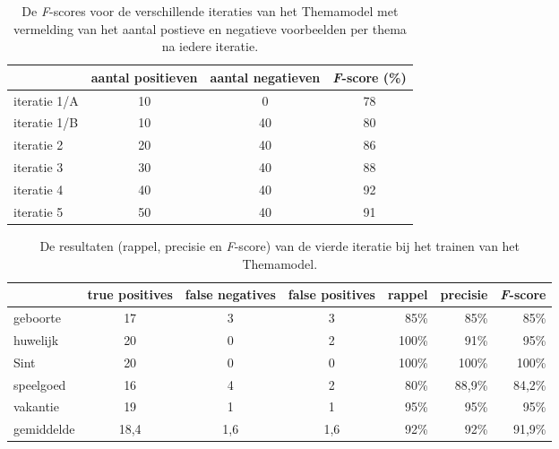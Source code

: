 \begin{table}
    \centering
    \renewcommand\arraystretch{1.2}
    \begin{tabular}{l|cc|c}
        \toprule
        & aantal positieven  &  aantal negatieven & \textit{F}-score (\%)\\
        \midrule
        iteratie 1/A & 10 & 0 & 78 \\
        iteratie 1/B & 10 & 40 & 80 \\
        iteratie 2 & 20 & 40 & 86 \\
        iteratie 3 & 30 & 40 & 88 \\
        iteratie 4 & 40 & 40 & 92 \\
        iteratie 5 & 50 & 40 & 91 \\
        \bottomrule
    \end{tabular}
    \caption[De \textit{F}-scores voor de verschillende iteraties van het Themamodel.]{De \textit{F}-scores voor de verschillende iteraties van het Themamodel met vermelding van het aantal postieve en negatieve voorbeelden per thema na iedere iteratie.}
    \label{tab:validatie-themamodel}
\end{table}


\begin{table}
    \centering
    \renewcommand\arraystretch{1.2}
    \begin{tabular}{l|ccc|rrr}
        \toprule
        & true positives  & false negatives & false positives & rappel & precisie & \textit{F}-score \\
        \midrule
        geboorte & 17 & 3 & 3 & 85\% & 85\% & 85\% \\
        huwelijk & 20 & 0 & 2 & 100\% & 91\% & 95\% \\
        Sint & 20 & 0 & 0 & 100\% & 100\% & 100\% \\
        speelgoed & 16 & 4 & 2 & 80\% & 88,9\% & 84,2\% \\
        vakantie & 19 & 1 & 1 & 95\% & 95\% & 95\% \\
        \midrule
        gemiddelde & 18,4 & 1,6 & 1,6 & 92\% & 92\% & 91,9\% \\
        \bottomrule
    \end{tabular}
    \caption{De resultaten (rappel, precisie en \textit{F}-score) van de vierde iteratie bij het trainen van het Themamodel.}
    \label{tab:validatie-iteratie4-themamodel}
\end{table}

